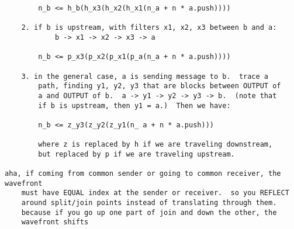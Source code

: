 \begin{verbatim}
		n_b <= h_b(h_x3(h_x2(h_x1(n_a + n * a.push))))

	2. if b is upstream, with filters x1, x2, x3 between b and a:
			b -> x1 -> x2 -> x3 -> a

		n_b <= p_x3(p_x2(p_x1(p_a(n_a + n * a.push))))

	3. in the general case, a is sending message to b.  trace a
		path, finding y1, y2, y3 that are blocks between OUTPUT of
		a and OUTPUT of b.  a -> y1 -> y2 -> y3 -> b.  (note that
		if b is upstream, then y1 = a.)  Then we have:

		n_b <= z_y3(z_y2(z_y1(n_ a + n * a.push)))

		where z is replaced by h if we are traveling downstream, 
		but replaced by p if we are traveling upstream.

aha, if coming from common sender or going to common receiver, the wavefront
	must have EQUAL index at the sender or receiver.  so you REFLECT
	around split/join points instead of translating through them.
	because if you go up one part of join and down the other, the
	wavefront shifts

\end{verbatim}


